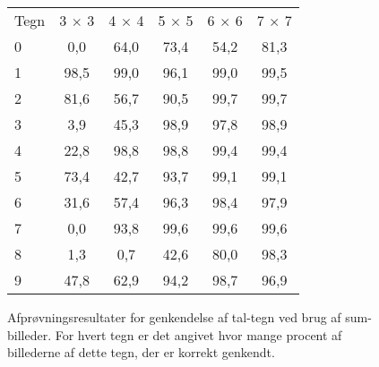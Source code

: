 \begin{figure}[htp]
\centering
\begin{tabular}{|l|c|c|c|c|c|}\hline
\rowcolor[gray]{0.9} \multicolumn{6}{|>{\columncolor[gray]{0.9}}c|}{\textbf{Sum-billeder}} \\ \hline
Tegn & 3 $\times$ 3 & 4 $\times$ 4 & 5 $\times$ 5 & 6 $\times$ 6 & 7 $\times$ 7\\\hline
0 & 0,0 & 64,0 & 73,4 & 54,2 & 81,3\\\hline
1 & 98,5  & 99,0 & 96,1 & 99,0 & 99,5\\\hline
2 & 81,6 & 56,7 & 90,5 & 99,7 & 99,7\\\hline
3 & 3,9 & 45,3 & 98,9 & 97,8 & 98,9\\\hline
4 & 22,8 & 98,8 & 98,8 & 99,4 & 99,4\\\hline
5 & 73,4 & 42,7 & 93,7 & 99,1 & 99,1\\\hline
6 & 31,6 & 57,4 & 96,3 & 98,4 & 97,9\\\hline
7 & 0,0 & 93,8 & 99,6 & 99,6 & 99,6\\\hline
8 & 1,3 & 0,7 & 42,6 & 80,0 & 98,3\\\hline
9 & 47,8 & 62,9 & 94,2 & 98,7 & 96,9\\\hline
\end{tabular}
\caption{Afprøvningsresultater for genkendelse af tal-tegn ved brug af sum-billeder. For hvert tegn er det angivet hvor mange procent af billederne af dette tegn, der er korrekt genkendt.}
\label{fig:test:sum_tal}
\end{figure}

